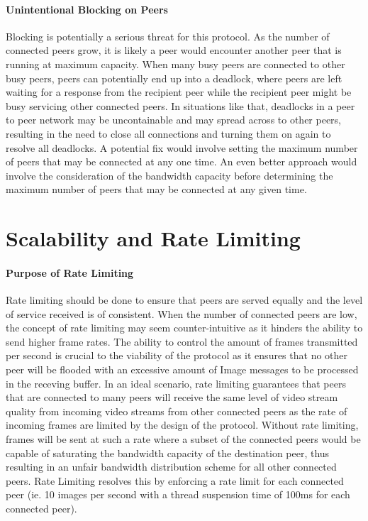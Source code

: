 \documentclass[10pt, twocolumn]{article}
\begin{document}
\paragraph{Unintentional Blocking on Peers}
Blocking is potentially a serious threat for this protocol. As the number of connected peers grow, it is likely a peer would encounter another peer that is running at maximum capacity. When many busy peers are connected to other busy peers, peers can potentially end up into a deadlock, where peers are left waiting for a response from the recipient peer while the recipient peer might be busy servicing other connected peers. In situations like that, deadlocks in a peer to peer network may be uncontainable and may spread across to other peers, resulting in the need to close all connections and turning them on again to resolve all deadlocks. A potential fix would involve setting the maximum number of peers that may be connected at any one time. An even better approach would involve the consideration of the bandwidth capacity before determining the maximum number of peers that may be connected at any given time.

\section{Scalability and Rate Limiting}
\paragraph{Purpose of Rate Limiting}
Rate limiting should be done to ensure that peers are served equally and the level of service received is of consistent. When the number of connected peers are low, the concept of rate limiting may seem counter-intuitive as it hinders the ability to send higher frame rates. The ability to control the amount of frames transmitted per second is crucial to the viability of the protocol as it ensures that no other peer will be flooded with an excessive amount of Image messages to be processed in the receving buffer. In an ideal scenario, rate limiting guarantees that peers that are connected to many peers will receive the same level of video stream quality from incoming video streams from other connected peers as the rate of incoming frames are limited by the design of the protocol. Without rate limiting, frames will be sent at such a rate where a subset of the connected peers would be capable of saturating the bandwidth capacity of the destination peer, thus resulting in an unfair bandwidth distribution scheme for all other connected peers. Rate Limiting resolves this by enforcing a rate limit for each connected peer (ie. 10 images per second with a thread suspension time of 100ms for each connected peer).
\end{document}
